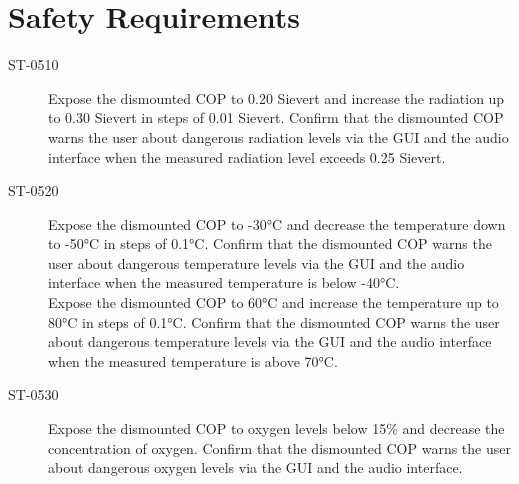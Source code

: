 \section{Safety Requirements}

\begin{description}
\item[ST-0510] Expose the dismounted COP to 0.20 Sievert and increase the radiation up to 0.30 Sievert in steps of 0.01 Sievert. Confirm that the dismounted COP warns the user about dangerous radiation levels via the GUI and the audio interface when the measured radiation level exceeds 0.25 Sievert. 
\item[ST-0520] Expose the dismounted COP to -30°C and decrease the temperature down to -50°C in steps of 0.1°C. Confirm that the dismounted COP warns the user about dangerous temperature levels via the GUI and the audio interface when the measured temperature is below -40°C.\\
Expose the dismounted COP to 60°C and increase the temperature up to 80°C in steps of 0.1°C. Confirm that the dismounted COP warns the user about dangerous temperature levels via the GUI and the audio interface when the measured temperature is above 70°C. 
\item[ST-0530] Expose the dismounted COP to oxygen levels below 15\% and decrease the concentration of oxygen. Confirm that the dismounted COP warns the user about dangerous oxygen levels via the GUI and the audio interface.
\end{description}